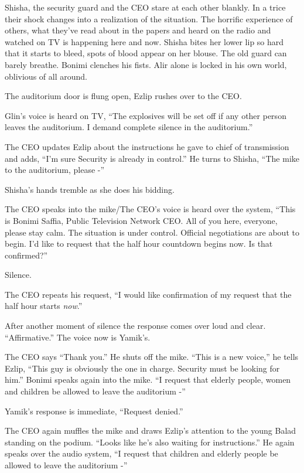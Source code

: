 \documentclass[twoside,11pt]{book}
\begin{document}
Shisha, the security guard and the CEO stare at each other{ }blankly. In a trice
their shock changes into a realization of the situation. The horrific experience of others, what they've read about in
the papers and heard on the radio and watched on TV is happening here and now. Shisha bites her lower lip so hard that
it starts to bleed, spots of blood appear{ }on her blouse. The old guard can
barely breathe. Bonimi clenches his fists. Alir alone is locked in his own world, oblivious of all around.

The auditorium door is flung open, Ezlip rushes over to the CEO.

Glin's voice is heard on TV, ``The explosives will be set off if any other person leaves the auditorium. I
demand complete silence in the auditorium.''

The CEO updates Ezlip about the instructions he gave to chief of transmission and adds, ``I'm sure Security
is already in control.'' He turns to Shisha, ``The mike to the auditorium, please
-''

Shisha's hands tremble as she does his bidding.

The CEO speaks into the mike/{The CEO's voice is heard over the system},
``This is Bonimi Saffia, Public Television Network CEO. All of you here, everyone, please stay calm. The
situation is under control. Official negotiations are about to{ }begin. I'd
like to request that the half hour{ }countdown{ }begins now. Is that
confirmed?''

Silence.

The CEO repeats his request, ``I would like confirmation of my request that the half hour starts
\textit{now}.''

After another moment of silence the response comes over loud and clear. ``Affirmative.'' The
voice now is Yamik's.

The CEO says ``Thank you.'' He shuts off the mike. ``This is a new voice,'' he
tells Ezlip, ``This guy is{ }obviously the one in charge. Security must
be{ }looking for him.'' Bonimi speaks again into the{ }mike.
``I request that elderly people, women and children be allowed to leave the auditorium -''

Yamik's response is immediate, ``Request denied.''

The CEO again muffles the mike and draws Ezlip's attention to the young Balad standing on the podium. ``Looks like he's
also waiting for instructions.'' He again speaks over the audio system, ``I request that
children and elderly people be allowed to leave the auditorium -''
\end{document}
